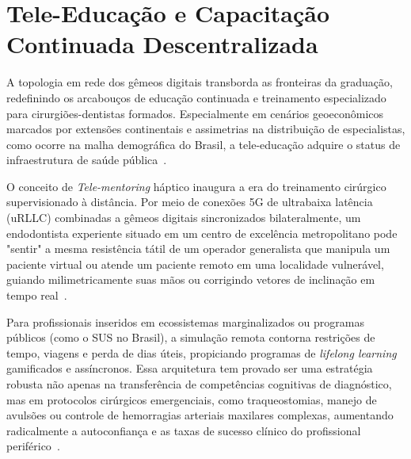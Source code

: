 \section{Tele-Educação e Capacitação Continuada Descentralizada}
\label{sec:tele-educacao}

A topologia em rede dos gêmeos digitais transborda as fronteiras da graduação, redefinindo os arcabouços de educação continuada e treinamento especializado para cirurgiões-dentistas formados. Especialmente em cenários geoeconômicos marcados por extensões continentais e assimetrias na distribuição de especialistas, como ocorre na malha demográfica do Brasil, a tele-educação adquire o status de infraestrutura de saúde pública~\cite{frota2025sus}.

O conceito de \textit{Tele-mentoring} háptico inaugura a era do treinamento cirúrgico supervisionado à distância. Por meio de conexões 5G de ultrabaixa latência (uRLLC) combinadas a gêmeos digitais sincronizados bilateralmente, um endodontista experiente situado em um centro de excelência metropolitano pode "sentir" a mesma resistência tátil de um operador generalista que manipula um paciente virtual ou atende um paciente remoto em uma localidade vulnerável, guiando milimetricamente suas mãos ou corrigindo vetores de inclinação em tempo real~\cite{cuadros2023access}.


Para profissionais inseridos em ecossistemas marginalizados ou programas públicos (como o SUS no Brasil), a simulação remota contorna restrições de tempo, viagens e perda de dias úteis, propiciando programas de \textit{lifelong learning} gamificados e assíncronos. Essa arquitetura tem provado ser uma estratégia robusta não apenas na transferência de competências cognitivas de diagnóstico, mas em protocolos cirúrgicos emergenciais, como traqueostomias, manejo de avulsões ou controle de hemorragias arteriais maxilares complexas, aumentando radicalmente a autoconfiança e as taxas de sucesso clínico do profissional periférico~\cite{du2020marginalized}.
